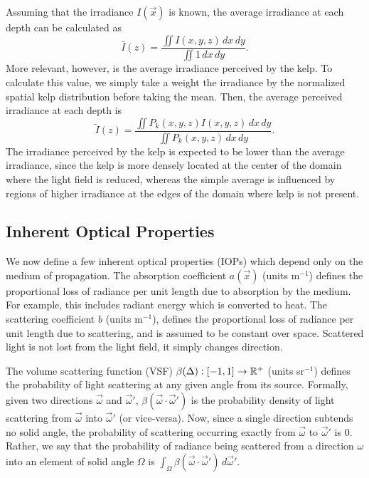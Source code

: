 Assuming that the irradiance $I(\vec{x})$ is known,
the average irradiance at each depth can be calculated as
\begin{equation*}
  \bar{I}(z) = \frac{\iint I(x,y,z)\, dx\, dy}{\iint 1\, dx\, dy}.
\end{equation*}
More relevant, however, is the average irradiance perceived by the kelp.
To calculate this value, we simply take a weight the irradiance by the
normalized spatial kelp distribution before taking the mean.
Then, the average perceived irradiance at each depth is
\newcommand{\Iperk}{\tilde{I}}
\begin{equation*}
   \Iperk(z) = \frac{\iint P_k(x,y,z)I(x,y,z)\, dx\, dy}{\iint P_k(x,y,z)\, dx\, dy}.
\end{equation*}
The irradiance perceived by the kelp is expected to be lower than the average irradiance,
since the kelp is more densely located at the center of the domain where the light field is reduced,
whereas the simple average is influenced by regions of higher irradiance at the edges of the domain where kelp is not present.

\subsection{Inherent Optical Properties}
\label{sec:iops}
We now define a few inherent optical properties (IOPs) which depend only on the medium of propagation.
The absorption coefficient $a(\vec{x})$ (units m$^{-1}$) defines the
proportional loss of radiance per unit length due to absorption by the medium.
For example, this includes radiant energy which is converted to heat.
The scattering coefficient $b$ (units m$^{-1}$), defines the proportional loss
of radiance per unit length due to scattering, and is assumed to be constant over space.
Scattered light is not lost from the light field, it simply changes direction.

The volume scattering function (VSF) $\beta(\Delta): [-1, 1] \to \mathbb{R}^+$ (units sr$^{-1}$) defines the probability of light scattering at any given angle from its source.
Formally, given two directions $\vec{\omega}$ and $\vec{\omega}'$, $\beta(\vec{\omega} \cdot \vec{\omega}')$ is the probability density of light scattering from $\vec{\omega}$ into $\vec{\omega}'$ (or vice-versa).
Now, since a single direction subtends no solid angle, the probability of scattering occurring exactly from $\vec{\omega}$ to $\vec{\omega}'$ is 0.
Rather, we say that the probability of radiance being scattered from a direction $\omega$ into an element of solid angle $\Omega$ is $\int_\Omega \beta(\vec{\omega} \cdot \vec{\omega}')\, d\vec{\omega}'$.

